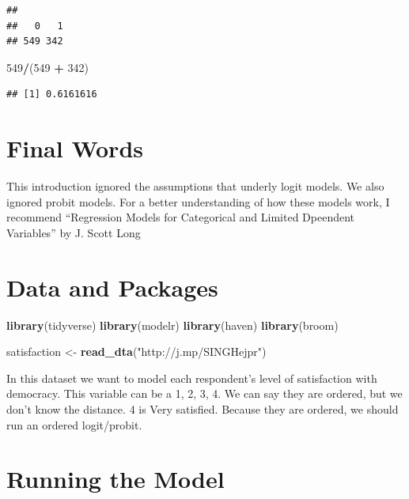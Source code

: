 \documentclass[]{book}
\newenvironment{Shaded}{\begin{snugshade}}{\end{snugshade}}
\newcommand{\KeywordTok}[1]{\textcolor[rgb]{0.13,0.29,0.53}{\textbf{#1}}}
\newcommand{\DecValTok}[1]{\textcolor[rgb]{0.00,0.00,0.81}{#1}}
\newcommand{\StringTok}[1]{\textcolor[rgb]{0.31,0.60,0.02}{#1}}
\newcommand{\OperatorTok}[1]{\textcolor[rgb]{0.81,0.36,0.00}{\textbf{#1}}}
\newcommand{\NormalTok}[1]{#1}
\begin{document}
\begin{verbatim}
## 
##   0   1 
## 549 342
\end{verbatim}

\begin{Shaded}
\begin{Highlighting}[]
\DecValTok{549}\OperatorTok{/}\NormalTok{(}\DecValTok{549} \OperatorTok{+}\StringTok{ }\DecValTok{342}\NormalTok{)}
\end{Highlighting}
\end{Shaded}

\begin{verbatim}
## [1] 0.6161616
\end{verbatim}

\section{Final Words}\label{final-words}

This introduction ignored the assumptions that underly logit models. We
also ignored probit models. For a better understanding of how these
models work, I recommend ``Regression Models for Categorical and Limited
Dpeendent Variables'' by J. Scott Long

\section{Data and Packages}\label{data-and-packages}

\begin{Shaded}
\begin{Highlighting}[]
\KeywordTok{library}\NormalTok{(tidyverse)}
\KeywordTok{library}\NormalTok{(modelr)}
\KeywordTok{library}\NormalTok{(haven)}
\KeywordTok{library}\NormalTok{(broom)}

\NormalTok{satisfaction <-}\StringTok{ }\KeywordTok{read_dta}\NormalTok{(}\StringTok{"http://j.mp/SINGHejpr"}\NormalTok{)}
\end{Highlighting}
\end{Shaded}

In this dataset we want to model each respondent's level of satisfaction
with democracy. This variable can be a 1, 2, 3, 4. We can say they are
ordered, but we don't know the distance. 4 is Very satisfied. Because
they are ordered, we should run an ordered logit/probit.

\section{Running the Model}\label{running-the-model}
\end{document}
